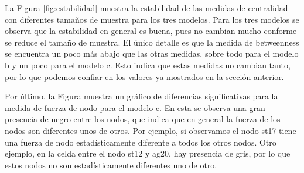 \documentclass[11pt,spanish]{article}\usepackage[]{graphicx}\usepackage[]{color}
\begin{document}
La Figura \ref{fig:estabilidad} muestra la estabilidad de las medidas de centralidad con diferentes tamaños de muestra para los tres modelos. Para los tres modelos se observa que la estabilidad en general es buena, pues no cambian mucho conforme se reduce el tamaño de muestra. El único detalle es que la medida de betweenness se encuentra un poco más abajo que las otras medidas, sobre todo para el modelo b y un poco para el modelo c. Esto indica que estas medidas no cambian tanto, por lo que podemos confiar en los valores ya mostrados en la sección anterior. 

Por último, la Figura  muestra un gráfico de diferencias significativas para la medida de fuerza de nodo para el modelo c. En esta se observa una gran presencia de negro entre los nodos, que indica que en general la fuerza de los nodos son diferentes unos de otros. Por ejemplo, si observamos el nodo st17 tiene una fuerza de nodo estadísticamente diferente a todos los otros nodos. Otro ejemplo, en la celda entre el nodo st12 y ag20, hay presencia de gris, por lo que estos nodos no son estadísticamente diferentes uno de otro. 
\end{document}
